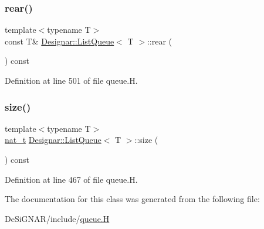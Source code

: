\subsubsection{\texorpdfstring{rear()}{rear()}\hspace{0.1cm}{\footnotesize\ttfamily [2/2]}}
{\footnotesize\ttfamily template$<$typename T$>$ \\
const T\& \hyperlink{class_designar_1_1_list_queue}{Designar\+::\+List\+Queue}$<$ T $>$\+::rear (\begin{DoxyParamCaption}{ }\end{DoxyParamCaption}) const\hspace{0.3cm}{\ttfamily [inline]}}



Definition at line 501 of file queue.\+H.

\mbox{\label{class_designar_1_1_list_queue_a0a2d3a25c27b0529b1bcc4b0c0b27855}} 
\subsubsection{\texorpdfstring{size()}{size()}}
{\footnotesize\ttfamily template$<$typename T$>$ \\
\hyperlink{namespace_designar_aa72662848b9f4815e7bf31a7cf3e33d1}{nat\+\_\+t} \hyperlink{class_designar_1_1_list_queue}{Designar\+::\+List\+Queue}$<$ T $>$\+::size (\begin{DoxyParamCaption}{ }\end{DoxyParamCaption}) const\hspace{0.3cm}{\ttfamily [inline]}}



Definition at line 467 of file queue.\+H.



The documentation for this class was generated from the following file\+:\begin{DoxyCompactItemize}
\item 
De\+Si\+G\+N\+A\+R/include/\hyperlink{queue_8_h}{queue.\+H}\end{DoxyCompactItemize}
